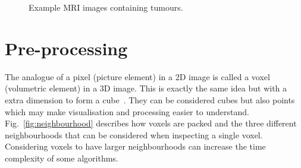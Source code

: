 \documentclass[journal]{IEEEtran}
\begin{document}
\begin{figure}[!htb]
	\centering
\caption{Example MRI images containing tumours.}
\label{fig:ex}
\end{figure}











\section{Pre-processing}
\label{sec:pre}

The analogue of a pixel (picture element) in a 2D image is called a voxel (volumetric element) in a 3D image.
This is exactly the same idea but with a extra dimension to form a cube~\cite{lohmann1998volumetric}.
They can be considered cubes but also points which may make visualisation and processing easier to understand.
Fig.~\ref{fig:neighbourhood} describes how voxels are packed and the three different neighbourhoods that can be considered when inspecting a single voxel. 
Considering voxels to have larger neighbourhoods can increase the time complexity of some algorithms.
\end{document}
